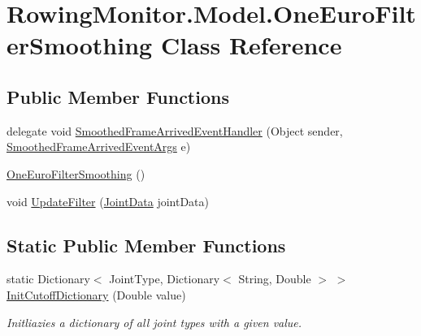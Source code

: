 \hypertarget{class_rowing_monitor_1_1_model_1_1_one_euro_filter_smoothing}{}\section{Rowing\+Monitor.\+Model.\+One\+Euro\+Filter\+Smoothing Class Reference}
\label{class_rowing_monitor_1_1_model_1_1_one_euro_filter_smoothing}
\subsection*{Public Member Functions}
\begin{DoxyCompactItemize}
\item 
delegate void \hyperlink{class_rowing_monitor_1_1_model_1_1_one_euro_filter_smoothing_a22becc35eb5432a3a90b8e61d5c8171f}{Smoothed\+Frame\+Arrived\+Event\+Handler} (Object sender, \hyperlink{class_rowing_monitor_1_1_model_1_1_smoothed_frame_arrived_event_args}{Smoothed\+Frame\+Arrived\+Event\+Args} e)
\item 
\hyperlink{class_rowing_monitor_1_1_model_1_1_one_euro_filter_smoothing_a1c3c89d4e59552370c5c0d56edac8a19}{One\+Euro\+Filter\+Smoothing} ()
\item 
void \hyperlink{class_rowing_monitor_1_1_model_1_1_one_euro_filter_smoothing_a2dcb40fcf4cd02302a23f421f710ac8c}{Update\+Filter} (\hyperlink{struct_rowing_monitor_1_1_model_1_1_util_1_1_joint_data}{Joint\+Data} joint\+Data)
\end{DoxyCompactItemize}
\subsection*{Static Public Member Functions}
\begin{DoxyCompactItemize}
\item 
static Dictionary$<$ Joint\+Type, Dictionary$<$ String, Double $>$ $>$ \hyperlink{class_rowing_monitor_1_1_model_1_1_one_euro_filter_smoothing_ab5e23859c5dbb67cdafebec5fea702f5}{Init\+Cutoff\+Dictionary} (Double value)
\begin{DoxyCompactList}\small\item\em Initliazies a dictionary of all joint types with a given value. \end{DoxyCompactList}\end{DoxyCompactItemize}
